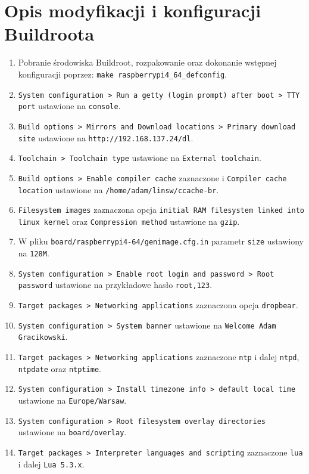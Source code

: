 \documentclass{article}
\begin{document}
\section{Opis modyfikacji i konfiguracji Buildroota}

\begin{enumerate}[label=\arabic*.]
    \item Pobranie środowiska Buildroot, rozpakowanie oraz dokonanie wstępnej konfiguracji poprzez: \texttt{make raspberrypi4\_64\_defconfig}.
    \item \texttt{System configuration > Run a getty (login prompt) after boot > TTY port} ustawione na \texttt{console}.
    \item \texttt{Build options > Mirrors and Download locations > Primary download site} ustawione na \texttt{http://192.168.137.24/dl}.
    \item \texttt{Toolchain > Toolchain type} ustawione na \texttt{External toolchain}.
    \item \texttt{Build options > Enable compiler cache} zaznaczone i \texttt{Compiler cache location} ustawione na \texttt{/home/adam/linsw/ccache-br}.
    \item \texttt{Filesystem images} zaznaczona opcja \texttt{initial RAM filesystem 
linked into linux kernel} oraz \texttt{Compression method} ustawione na \texttt{gzip}.
    \item W pliku \texttt{board/raspberrypi4-64/genimage.cfg.in} parametr \texttt{size} ustawiony na \texttt{128M}.
    \item \texttt{System configuration > Enable root login and password > Root password} ustawione na przykładowe hasło \texttt{root,123}.
    \item \texttt{Target packages > Networking applications} zaznaczona opcja \texttt{dropbear}.
    \item \texttt{System configuration > System banner} ustawione na \texttt{Welcome Adam Gracikowski}.
    \item \texttt{Target packages > Networking applications} zaznaczone \texttt{ntp} i dalej 
    \texttt{ntpd}, \texttt{ntpdate} oraz \texttt{ntptime}.
    \item \texttt{System configuration > Install timezone info > default local time} ustawione na \texttt{Europe/Warsaw}.
    \item \texttt{System configuration > Root filesystem overlay directories} ustawione na \texttt{board/overlay}.
    \item \texttt{Target packages > Interpreter languages and scripting} zaznaczone \texttt{lua} i dalej \texttt{Lua 5.3.x}.

\end{enumerate}
\end{document}
